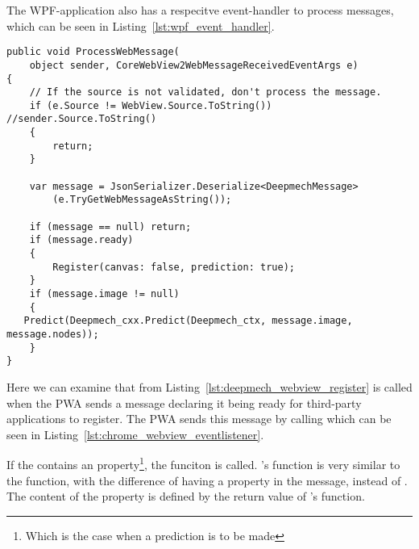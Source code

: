 The WPF-application also has a respecitve event-handler to process messages, which can be seen in Listing~\ref{lst:wpf_event_handler}.

\begin{lstlisting}[label={lst:wpf_event_handler}, caption={Event handler of the WPF-application}]
public void ProcessWebMessage(
    object sender, CoreWebView2WebMessageReceivedEventArgs e)
{
    // If the source is not validated, don't process the message.
    if (e.Source != WebView.Source.ToString()) //sender.Source.ToString()
    {
        return;
    }

    var message = JsonSerializer.Deserialize<DeepmechMessage>
        (e.TryGetWebMessageAsString());

    if (message == null) return;
    if (message.ready)
    {
        Register(canvas: false, prediction: true);
    }
    if (message.image != null)
    {
   Predict(Deepmech_cxx.Predict(Deepmech_ctx, message.image, message.nodes));
    }
}
\end{lstlisting}

Here we can examine that  from Listing~\ref{lst:deepmech_webview_register} is called when the PWA sends a message declaring it being ready for third-party applications to register.
The PWA sends this message by calling  which can be seen in Listing~\ref{lst:chrome_webview_eventlistener}.

If the  contains an  property\footnote{Which is the case when a prediction is to be made}, the  funciton is called.
's  function is very similar to the  function, with the difference of having a  property in the message, instead of .
The content of the  property is defined by the return value of 's  function.





